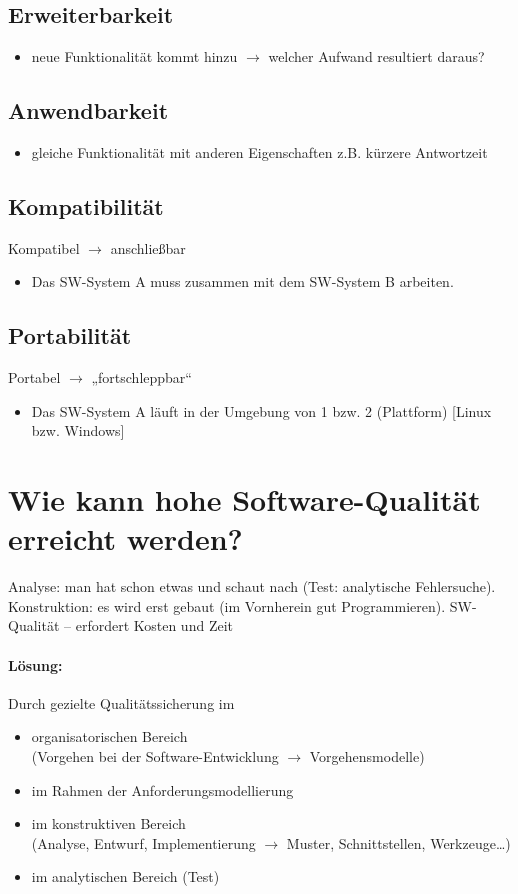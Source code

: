 \documentclass{scrreprt}
\begin{document}
\subsection{Erweiterbarkeit}
\begin{itemize}
\item neue Funktionalität kommt hinzu $\to$ welcher Aufwand resultiert daraus?
\end{itemize}

\subsection{Anwendbarkeit}
\begin{itemize}
\item gleiche Funktionalität mit anderen Eigenschaften z.B. kürzere Antwortzeit
\end{itemize}

\subsection{Kompatibilität}
Kompatibel $\to$ anschließbar
\begin{itemize}
\item Das SW-System A muss zusammen mit dem SW-System B arbeiten.
\end{itemize}

\subsection{Portabilität}
Portabel $\to$ „fortschleppbar“
\begin{itemize}
\item Das SW-System A läuft in der Umgebung von 1 bzw. 2 (Plattform) [Linux bzw. Windows]
\end{itemize}


\section{Wie kann hohe Software-Qualität erreicht werden?}
Analyse: man hat schon etwas und schaut nach (Test: analytische Fehlersuche).\\
Konstruktion: es wird erst gebaut (im Vornherein gut Programmieren).
SW-Qualität -- erfordert Kosten und Zeit
\paragraph{Lösung:}
Durch gezielte Qualitätssicherung im 
\begin{itemize}
\item organisatorischen Bereich\\
(Vorgehen bei der Software-Entwicklung $\to$ Vorgehensmodelle)
\item im Rahmen der Anforderungsmodellierung
\item im konstruktiven Bereich\\
(Analyse, Entwurf, Implementierung $\to$ Muster, Schnittstellen, Werkzeuge…)
\item im analytischen Bereich (Test)
\end{itemize}
\end{document}
